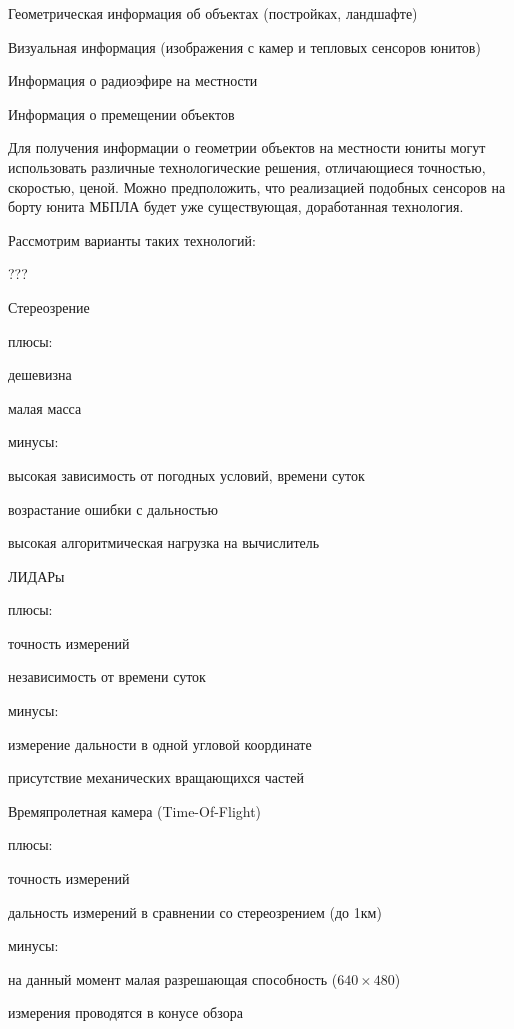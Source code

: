 \begin{mintemize}
\item Геометрическая информация об объектах (постройках, ландшафте)
\item Визуальная информация (изображения с камер и тепловых сенсоров юнитов)
\item Информация о радиоэфире на местности
\item Информация о премещении объектов
\end{mintemize}

Для получения информации о геометрии объектов на местности юниты могут
использовать различные технологические решения, отличающиеся точностью,
скоростью, ценой. Можно предположить, что реализацией подобных сенсоров на
борту юнита МБПЛА будет уже существующая, доработанная технология.

Рассмотрим варианты таких технологий:

???
\begin{mintemize}
\item Стереозрение

    плюсы:
    \begin{mintemize}
    \item дешевизна
    \item малая масса
    \end{mintemize}
    минусы:
    \begin{mintemize}
    \item высокая зависимость от погодных условий, времени суток
    \item возрастание ошибки с дальностью
    \item высокая алгоритмическая нагрузка на вычислитель
    \end{mintemize}
\item ЛИДАРы

    плюсы:
    \begin{mintemize}
    \item точность измерений
    \item независимость от времени суток
    \end{mintemize}
    минусы:
    \begin{mintemize}
    \item измерение дальности в одной угловой координате
    \item присутствие механических вращающихся частей
    \end{mintemize}

\item Времяпролетная камера (Time-Of-Flight)

    плюсы:
    \begin{mintemize}
    \item точность измерений
    \item дальность измерений в сравнении со стереозрением (до 1км)
    \end{mintemize}
    минусы:
    \begin{mintemize}
    \item на данный момент малая разрешающая способность ($640 \times 480$)
    \item измерения проводятся в конусе обзора
    \end{mintemize}
\end{mintemize}

